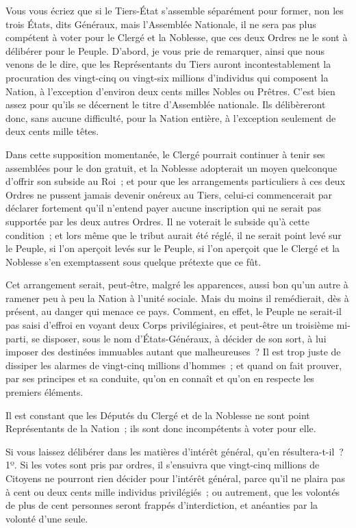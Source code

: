 \documentclass[french,twoside]{book} %
\begin{document}
Vous vous écriez que si le Tiers-État s’assemble séparément pour former, non les trois États, dits Généraux, mais l’Assemblée Nationale, il ne sera pas plus compétent à voter pour le Clergé et la Noblesse, que ces deux Ordres ne le sont à délibérer pour le Peuple. D’abord, je vous prie de remarquer, ainsi que nous venons de le dire, que les Représentants du Tiers auront incontestablement la procuration des vingt-cinq ou vingt-six millions d’individus qui composent la Nation, à l’exception d’environ deux cents milles Nobles ou Prêtres. C’est bien assez pour qu’ils se décernent le titre d’Assemblée nationale. Ils délibèreront donc, sans aucune difficulté, pour la Nation entière, à l’exception seulement de deux cents mille têtes.\par
Dans cette supposition momentanée, le Clergé pourrait continuer à tenir ses assemblées pour le don gratuit, et la Noblesse adopterait un moyen quelconque d’offrir son subside au Roi ; et pour que les arrangements particuliers à ces deux Ordres ne pussent jamais devenir onéreux au Tiers, celui-ci commencerait par déclarer fortement qu’il n’entend payer aucune inscription qui ne serait pas supportée par les deux autres Ordres. Il ne voterait le subside qu’à cette condition ; et lors même que le tribut aurait été réglé, il ne serait point levé sur le Peuple, si l’on aperçoit levés sur le Peuple, si l’on aperçoit que le Clergé et la Noblesse s’en exemptassent sous quelque prétexte que ce fût.\par
Cet arrangement serait, peut-être, malgré les apparences, aussi bon qu’un autre à ramener peu à peu la Nation à l’unité sociale. Mais du moins il remédierait, dès à présent, au danger qui menace ce pays. Comment, en effet, le Peuple ne serait-il pas saisi d’effroi en voyant deux Corps privilégiaires, et peut-être un troisième mi-parti, se disposer, sous le nom d’États-Généraux, à décider de son sort, à lui imposer des destinées immuables autant que malheureuses ? Il est trop juste de dissiper les alarmes de vingt-cinq millions d’hommes ; et quand on fait prouver, par ses principes et sa conduite, qu’on en connaît et qu’on en respecte les premiers éléments.\par
Il est constant que les Députés du Clergé et de la Noblesse ne sont point Représentants de la Nation ; ils sont donc incompétents à voter pour elle.\par
Si vous laissez délibérer dans les matières d’intérêt général, qu’en résultera-t-il ? 1º. Si les votes sont pris par ordres, il s’ensuivra que vingt-cinq millions de Citoyens ne pourront rien décider pour l’intérêt général, parce qu’il ne plaira pas à cent ou deux cents mille individus privilégiés ; ou autrement, que les volontés de plus de cent personnes seront frappés d’interdiction, et anéanties par la volonté d’une seule.\par
\end{document}
